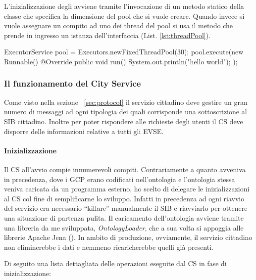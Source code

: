 L'inizializzazione degli  avviene tramite l'invocazione di un metodo statico della classe  che specifica la dimensione del pool che si vuole creare. Quando invece si vuole assegnare un compito ad uno dei thread del pool si usa il metodo  che prende in ingresso un istanza dell'interfaccia  (List. \ref{lst:threadPool}).

\begin{java}[caption={Creazione Pool di Thread},label={lst:threadPool}]
ExecutorService pool = Executors.newFixedThreadPool(30);
pool.execute(new Runnable() {
	@Override
	public void run() {
		System.out.println("hello world");
	}
});
\end{java}

\subsubsection{Il funzionamento del City Service}
 
Come visto nella sezione ~\ref{sec:protocol} il servizio cittadino deve gestire un gran numero di messaggi ad ogni tipologia dei quali corrisponde una sottoscrizione al SIB cittadino. Inoltre per poter rispondere alle richieste degli utenti il CS deve disporre delle informazioni relative a tutti gli EVSE.

\paragraph{Inizializzazione}\label{subsubsec:city-init}

Il CS all'avvio compie innumerevoli compiti. Contrariamente a quanto avveniva in precedenza, dove i GCP erano codificati nell'ontologia e l'ontologia stessa veniva caricata da un programma esterno, ho scelto di delegare le inizializzazioni al CS col fine di semplificarne lo sviluppo. Infatti in precedenza ad ogni riavvio del servizio era necessario ``killare'' manualmente il SIB e riavviarlo per ottenere una situazione di partenza pulita. Il caricamento dell'ontologia avviene tramite una libreria da me sviluppata, \emph{OntologyLoader}, che a sua volta si appoggia alle librerie Apache Jena (\cite{jena2011}). In ambito di produzione, ovviamente, il servizio cittadino non eliminerebbe i dati e nemmeno ricaricherebbe quelli già presenti.

Di seguito una lista dettagliata delle operazioni eseguite dal CS in fase di inizializzazione:

